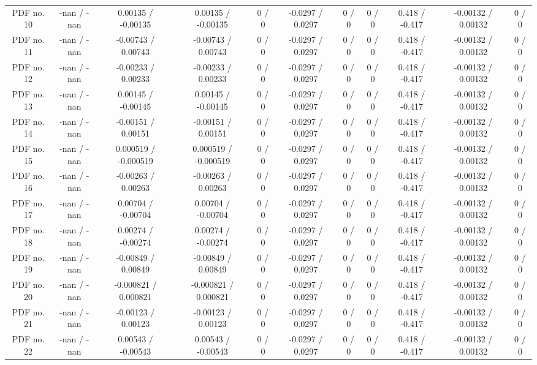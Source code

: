\begin{table}[htbp]
\begin{center}
\begin{tabular}{|c|c|c|c|c|c|c|c|c|c|c|}
  PDF no. 10 & -nan / -nan & 0.00135 / -0.00135 & 0.00135 / -0.00135 & 0 / 0 & -0.0297 / 0.0297 & 0 / 0 & 0 / 0 & 0.418 / -0.417 & -0.00132 / 0.00132 & 0 / 0 \\ 
  PDF no. 11 & -nan / -nan & -0.00743 / 0.00743 & -0.00743 / 0.00743 & 0 / 0 & -0.0297 / 0.0297 & 0 / 0 & 0 / 0 & 0.418 / -0.417 & -0.00132 / 0.00132 & 0 / 0 \\ 
  PDF no. 12 & -nan / -nan & -0.00233 / 0.00233 & -0.00233 / 0.00233 & 0 / 0 & -0.0297 / 0.0297 & 0 / 0 & 0 / 0 & 0.418 / -0.417 & -0.00132 / 0.00132 & 0 / 0 \\ 
  PDF no. 13 & -nan / -nan & 0.00145 / -0.00145 & 0.00145 / -0.00145 & 0 / 0 & -0.0297 / 0.0297 & 0 / 0 & 0 / 0 & 0.418 / -0.417 & -0.00132 / 0.00132 & 0 / 0 \\ 
  PDF no. 14 & -nan / -nan & -0.00151 / 0.00151 & -0.00151 / 0.00151 & 0 / 0 & -0.0297 / 0.0297 & 0 / 0 & 0 / 0 & 0.418 / -0.417 & -0.00132 / 0.00132 & 0 / 0 \\ 
  PDF no. 15 & -nan / -nan & 0.000519 / -0.000519 & 0.000519 / -0.000519 & 0 / 0 & -0.0297 / 0.0297 & 0 / 0 & 0 / 0 & 0.418 / -0.417 & -0.00132 / 0.00132 & 0 / 0 \\ 
  PDF no. 16 & -nan / -nan & -0.00263 / 0.00263 & -0.00263 / 0.00263 & 0 / 0 & -0.0297 / 0.0297 & 0 / 0 & 0 / 0 & 0.418 / -0.417 & -0.00132 / 0.00132 & 0 / 0 \\ 
  PDF no. 17 & -nan / -nan & 0.00704 / -0.00704 & 0.00704 / -0.00704 & 0 / 0 & -0.0297 / 0.0297 & 0 / 0 & 0 / 0 & 0.418 / -0.417 & -0.00132 / 0.00132 & 0 / 0 \\ 
  PDF no. 18 & -nan / -nan & 0.00274 / -0.00274 & 0.00274 / -0.00274 & 0 / 0 & -0.0297 / 0.0297 & 0 / 0 & 0 / 0 & 0.418 / -0.417 & -0.00132 / 0.00132 & 0 / 0 \\ 
  PDF no. 19 & -nan / -nan & -0.00849 / 0.00849 & -0.00849 / 0.00849 & 0 / 0 & -0.0297 / 0.0297 & 0 / 0 & 0 / 0 & 0.418 / -0.417 & -0.00132 / 0.00132 & 0 / 0 \\ 
  PDF no. 20 & -nan / -nan & -0.000821 / 0.000821 & -0.000821 / 0.000821 & 0 / 0 & -0.0297 / 0.0297 & 0 / 0 & 0 / 0 & 0.418 / -0.417 & -0.00132 / 0.00132 & 0 / 0 \\ 
  PDF no. 21 & -nan / -nan & -0.00123 / 0.00123 & -0.00123 / 0.00123 & 0 / 0 & -0.0297 / 0.0297 & 0 / 0 & 0 / 0 & 0.418 / -0.417 & -0.00132 / 0.00132 & 0 / 0 \\ 
  PDF no. 22 & -nan / -nan & 0.00543 / -0.00543 & 0.00543 / -0.00543 & 0 / 0 & -0.0297 / 0.0297 & 0 / 0 & 0 / 0 & 0.418 / -0.417 & -0.00132 / 0.00132 & 0 / 0 \\ 

\end{tabular}
\end{center}
\end{table}
